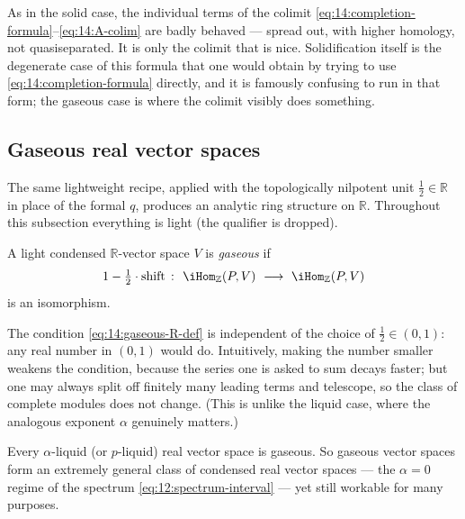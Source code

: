 \begin{remark}
\label{rmk:14:individual-terms}
As in the solid case, the individual terms of the colimit
\eqref{eq:14:completion-formula}--\eqref{eq:14:A-colim} are badly behaved --- spread
out, with higher homology, not quasiseparated. It is only the colimit that is nice.
Solidification itself is the degenerate case of this formula that one would obtain
by trying to use \eqref{eq:14:completion-formula} directly, and it is famously
confusing to run in that form; the gaseous case is where the colimit visibly does
something.
\end{remark}

\subsection{Gaseous real vector spaces}

The same lightweight recipe, applied with the topologically nilpotent unit
$\tfrac12\in\mathbb{R}$ in place of the formal $q$, produces an analytic ring
structure on $\mathbb{R}$. Throughout this subsection everything is light (the
qualifier is dropped).

\begin{definition}
\label{def:14:gaseous-R}
A light condensed $\mathbb{R}$-vector space $V$ is \emph{gaseous} if
\begin{equation}
\label{eq:14:gaseous-R-def}
1-\tfrac12\cdot\mathrm{shift}\ \colon\ \iHom_{\mathbb{Z}}(P,V)\ \longrightarrow\ \iHom_{\mathbb{Z}}(P,V)
\end{equation}
is an isomorphism.
\end{definition}

\begin{remark}
\label{rmk:14:independent-half}
The condition \eqref{eq:14:gaseous-R-def} is independent of the choice of
$\tfrac12\in(0,1)$: any real number in $(0,1)$ would do. Intuitively, making the
number smaller weakens the condition, because the series one is asked to sum decays
faster; but one may always split off finitely many leading terms and telescope, so
the class of complete modules does not change. (This is unlike the liquid case,
where the analogous exponent $\alpha$ genuinely matters.)
\end{remark}

\begin{remark}
\label{rmk:14:gaseous-weakest}
Every $\alpha$-liquid (or $p$-liquid) real vector space is gaseous. So gaseous
vector spaces form an extremely general class of condensed real vector spaces --- the
$\alpha=0$ regime of the spectrum \eqref{eq:12:spectrum-interval} --- yet still
workable for many purposes.
\end{remark}

